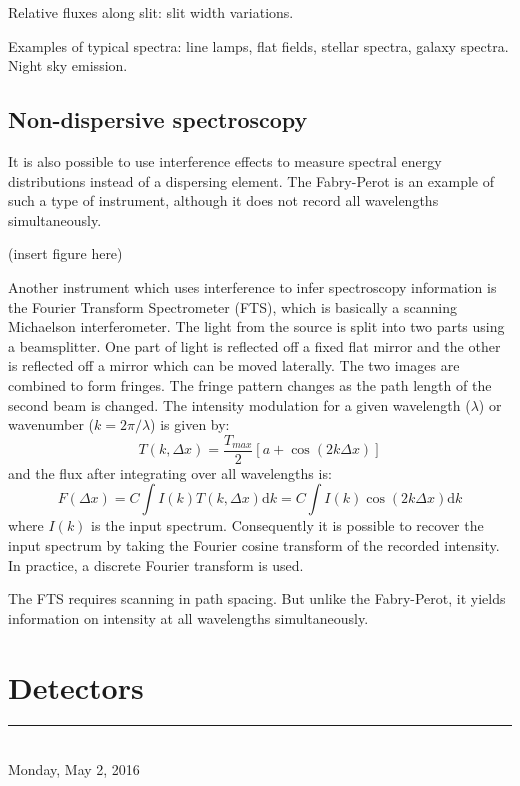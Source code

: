 \documentclass[12pt]{article}
\begin{document}
Relative fluxes along slit: slit width variations.

Examples of typical spectra: line lamps, flat fields, stellar spectra,
galaxy spectra. Night sky emission.

\subsection{Non-dispersive spectroscopy}

It is also possible to use interference effects to measure spectral
energy distributions instead of a dispersing element. The Fabry-Perot
is an example of such a type of instrument, although it does not
record all wavelengths simultaneously.

(insert figure here)

Another instrument which uses interference to infer spectroscopy
information is the Fourier Transform Spectrometer (FTS), which is
basically a scanning Michaelson interferometer. The light from the
source is split into two parts using a beamsplitter. One part of light
is reflected off a fixed flat mirror and the other is reflected off a
mirror which can be moved laterally. The two images are combined to
form fringes. The fringe pattern changes as the path length of the
second beam is changed. The intensity modulation for a given
wavelength ($\lambda$) or wavenumber ($k = 2\pi/\lambda$) is
given by:{$$
    T\left(k,\Delta{x}\right) = \frac{T_{max}}{2}
    \left[a + \cos\left(2k\Delta{x}\right)\right]
$$}and the flux after integrating over all wavelengths is:{$$
    F\left(\Delta{x}\right) =
    C\int{I(k)T(k,\Delta{x})\textrm{d}k} =
    C\int{I(k)\cos(2k\Delta{x})\textrm{d}k}
$$}where $I(k)$ is the input spectrum. Consequently it is possible to
recover the input spectrum by taking the Fourier cosine transform of
the recorded intensity. In practice, a discrete Fourier transform is
used.

The FTS requires scanning in path spacing. But unlike the Fabry-Perot,
it yields information on intensity at all wavelengths simultaneously.

\newpage\section{Detectors}
\rule{\textwidth}{0.4pt}\\
\textcolor{date}{Monday, May 2, 2016}
\end{document}
